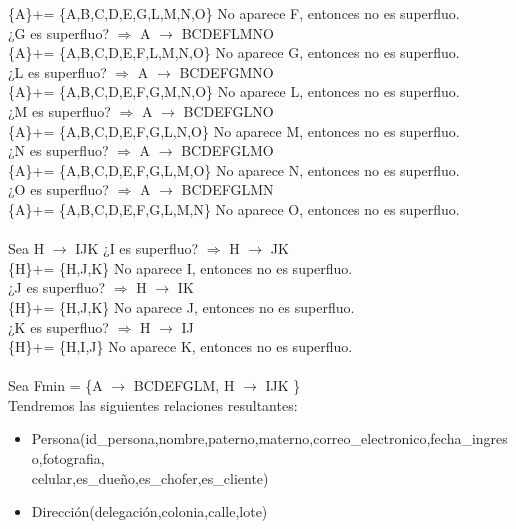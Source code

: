 \documentclass{article}
\begin{document}
\begin{itemize}
\{A\}+= \{A,B,C,D,E,G,L,M,N,O\}  No aparece F, entonces no es superfluo.\\
¿G es superfluo? $\Rightarrow$ A $\rightarrow$ BCDEFLMNO \\
\{A\}+= \{A,B,C,D,E,F,L,M,N,O\}  No aparece G, entonces no es superfluo.\\
¿L es superfluo? $\Rightarrow$ A $\rightarrow$ BCDEFGMNO \\
\{A\}+= \{A,B,C,D,E,F,G,M,N,O\}  No aparece L, entonces no es superfluo.\\
¿M es superfluo? $\Rightarrow$ A $\rightarrow$ BCDEFGLNO \\
\{A\}+= \{A,B,C,D,E,F,G,L,N,O\}  No aparece M, entonces no es superfluo.\\
¿N es superfluo? $\Rightarrow$ A $\rightarrow$ BCDEFGLMO \\
\{A\}+= \{A,B,C,D,E,F,G,L,M,O\}  No aparece N, entonces no es superfluo.\\
¿O es superfluo? $\Rightarrow$ A $\rightarrow$ BCDEFGLMN \\
\{A\}+= \{A,B,C,D,E,F,G,L,M,N\}  No aparece O, entonces no es superfluo.\\
\\

Sea H $\rightarrow$ IJK 
¿I es superfluo? $\Rightarrow$ H $\rightarrow$ JK \\
\{H\}+= \{H,J,K\} No aparece I, entonces no es superfluo.\\
¿J es superfluo? $\Rightarrow$ H $\rightarrow$ IK \\
\{H\}+= \{H,J,K\} No aparece J, entonces no es superfluo.\\
¿K es superfluo? $\Rightarrow$ H $\rightarrow$ IJ \\
\{H\}+= \{H,I,J\} No aparece K, entonces no es superfluo.\\
\\
Sea Fmin = \{A $\rightarrow$ BCDEFGLM, H $\rightarrow$ IJK  \}\\
Tendremos las siguientes relaciones resultantes:
\begin{itemize}
\item Persona(id\_persona,nombre,paterno,materno,correo\_electronico,fecha\_ingreso,fotografia,\\ celular,es\_dueño,es\_chofer,es\_cliente)
\item Dirección(delegación,colonia,calle,lote)
\end{itemize}







\end{itemize}
\end{document}
